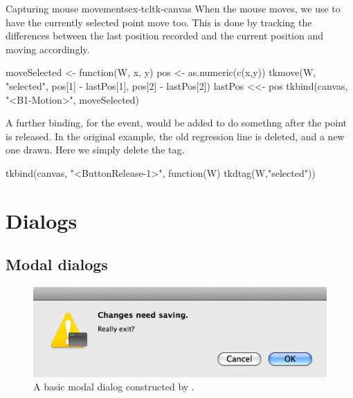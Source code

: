 \begin{example}{Capturing mouse movements}{ex-tcltk-canvas}
When the mouse moves, we use  to have the currently
selected point move too. This is done by tracking the differences
between the last position recorded and the current position and moving
accordingly.
\begin{Schunk}
\begin{Sinput}
 moveSelected <- function(W, x, y) {
   pos <- as.numeric(c(x,y))
   tkmove(W, "selected", pos[1] - lastPos[1], pos[2] - lastPos[2])
   lastPos <<- pos
 }
 tkbind(canvas, "<B1-Motion>", moveSelected)
\end{Sinput}
\end{Schunk}

A further binding, for the  event, would be
added to do somethng after the point is released. In the original
example, the old regression line is deleted, and a new one drawn. Here
we simply delete the  tag.
\begin{Schunk}
\begin{Sinput}
 tkbind(canvas, "<ButtonRelease-1>", function(W) tkdtag(W,"selected"))
\end{Sinput}
\end{Schunk}


\end{example}



\section{Dialogs}
\label{sec:tcltk:dialogs}
\subsection{Modal dialogs}
\label{sec:modal-dialogs}

\begin{figure}
  \centering
  \includegraphics[width=.6\textwidth]{fig-tcltk-confirm-dialog.png}
  \caption{A basic modal dialog constructed by .}
  \label{fig:fig-tcltk-confirm-dialog}
\end{figure}

